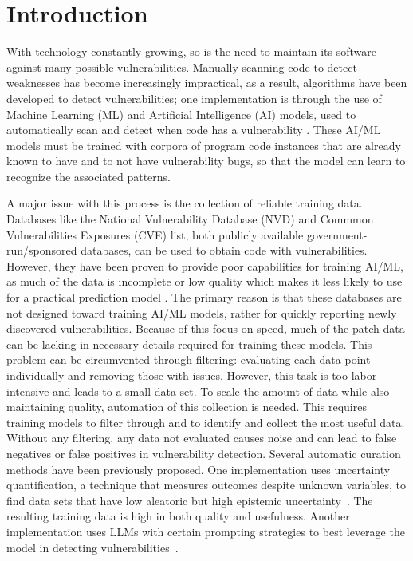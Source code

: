 \section{Introduction}
\done{}

With technology constantly growing, so is the need to maintain its software against many possible vulnerabilities. Manually scanning code to detect weaknesses has become increasingly impractical, as a result, algorithms have been developed to detect vulnerabilities; one implementation is through the use of Machine Learning (ML) and Artificial Intelligence (AI) models, used to automatically scan and detect when code has a vulnerability \cite{mirsky2023vulchecker, fu2022linevul, chen2024improvingdatacurationsoftware} \cite{dil2025}. These AI/ML models must be trained with corpora of program code instances that are already known to have and to not have vulnerability bugs, so that the model can learn to recognize the associated patterns.

A major issue with this process is the collection of reliable training data. Databases like the National Vulnerability Database (NVD) and Commmon Vulnerabilities Exposures (CVE) list, both publicly available government-run/sponsored databases, can be used to obtain code with vulnerabilities. However, they have been proven to provide poor capabilities for training AI/ML, as much of the data is incomplete or low quality which makes it less likely to use for a practical prediction model \cite{zhang2011empirical}. The primary reason is that these databases are not designed toward training AI/ML models, rather for quickly reporting newly discovered vulnerabilities. Because of this focus on speed, much of the patch data can be lacking in necessary details required for training these models. This problem can be circumvented through filtering: evaluating each data point individually and removing those with issues. However, this task is too labor intensive and leads to a small data set. To scale the amount of data while also maintaining quality, automation of this collection is needed. This requires training models to filter through and to identify and collect the most useful data. Without any filtering, any data not evaluated causes noise and can lead to false negatives or false positives in vulnerability detection. Several automatic curation methods have been previously proposed. One implementation uses uncertainty quantification, a technique that measures outcomes despite unknown variables, to find data sets that have low aleatoric but high epistemic uncertainty~\cite{chen2024improvingdatacurationsoftware}. The resulting training data is high in both quality and usefulness. Another implementation uses LLMs with certain prompting strategies to best leverage the model in detecting vulnerabilities~\cite{dil2025}.

